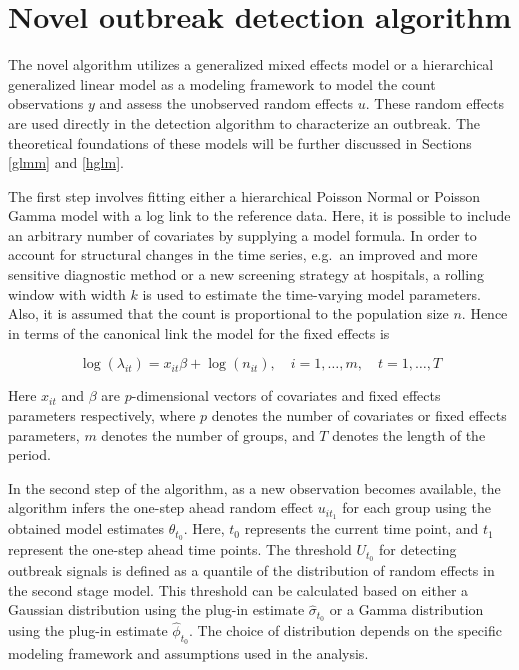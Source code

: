 \documentclass[preprint, 3p, authoryear]{elsarticle} %
\begin{document}
\hypertarget{novel-outbreak-detection-algorithm}{%
\section{Novel outbreak detection algorithm}\label{novel-outbreak-detection-algorithm}}

The novel algorithm utilizes a generalized mixed effects model or a hierarchical generalized linear model as a modeling framework to model the count observations \(y\) and assess the unobserved random effects \(u\). These random effects are used directly in the detection algorithm to characterize an outbreak. The theoretical foundations of these models will be further discussed in Sections \ref{glmm} and \ref{hglm}.

The first step involves fitting either a hierarchical Poisson Normal or Poisson Gamma model with a log link to the reference data. Here, it is possible to include an arbitrary number of covariates by supplying a model formula. In order to account for structural changes in the time series, e.g.~an improved and more sensitive diagnostic method or a new screening strategy at hospitals, a rolling window with width \(k\) is used to estimate the time-varying model parameters. Also, it is assumed that the count is proportional to the population size \(n\). Hence in terms of the canonical link the model for the fixed effects is

\begin{equation}
  \log(\lambda_{it}) = x_{it}\beta + \log(n_{it}), \quad i=1,\dots,m, \quad t=1,\dots,T
\end{equation}

Here \(x_{it}\) and \(\beta\) are \(p\)-dimensional vectors of covariates and fixed effects parameters respectively, where \(p\) denotes the number of covariates or fixed effects parameters, \(m\) denotes the number of groups, and \(T\) denotes the length of the period.

In the second step of the algorithm, as a new observation becomes available, the algorithm infers the one-step ahead random effect \(u_{it_1}\) for each group using the obtained model estimates \(\theta_{t_0}\). Here, \(t_0\) represents the current time point, and \(t_1\) represent the one-step ahead time points. The threshold \(U_{t_0}\) for detecting outbreak signals is defined as a quantile of the distribution of random effects in the second stage model. This threshold can be calculated based on either a Gaussian distribution using the plug-in estimate \(\hat{\sigma}_{t_0}\) or a Gamma distribution using the plug-in estimate \(\hat{\phi}_{t_0}\). The choice of distribution depends on the specific modeling framework and assumptions used in the analysis.
\end{document}
